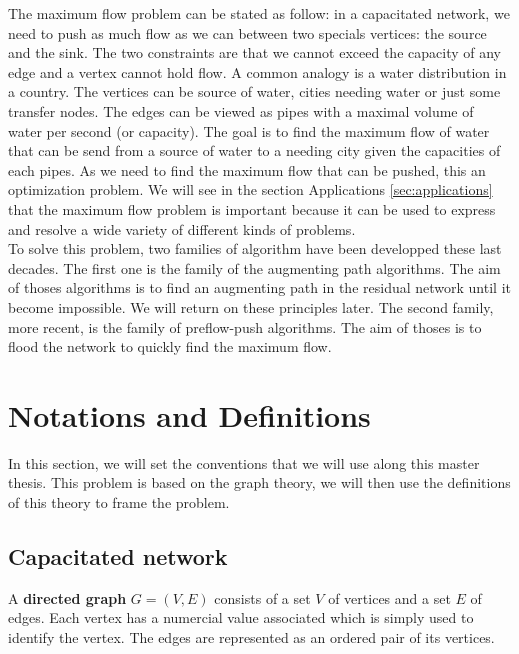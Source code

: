 The maximum flow problem can be stated as follow: in a capacitated network, we need to push as much flow as we can between two specials vertices: the source and the sink. The two constraints are that we cannot exceed the capacity of any edge and a vertex cannot hold flow. A common analogy is a water distribution in a country. The vertices can be source of water, cities needing water or just some transfer nodes. The edges can be viewed as pipes with a maximal volume of water per second (or capacity). The goal is to find the maximum flow of water that can be send from a source of water to a needing city given the capacities of each pipes. As we need to find the maximum flow that can be pushed, this an optimization problem. We will see in the section Applications \ref{sec:applications} that the maximum flow problem is important because it can be used to express and resolve a wide variety of different kinds of problems.\\

To solve this problem, two families of algorithm have been developped these last decades. The first one is the family of the augmenting path algorithms. The aim of thoses algorithms is to find an augmenting path in the residual network until it become impossible. We will return on these principles later. The second family, more recent, is the family of preflow-push algorithms. The aim of thoses is to flood the network to quickly find the maximum flow. \\


\section{Notations and Definitions}

In this section, we will set the conventions that we will use along this master thesis. This problem is based on the graph theory, we will then use the definitions of this theory to frame the problem.

\subsection{Capacitated network}
\begin{definition}
\label{dgraph}
A \textbf{directed graph} $G = (V, E)$ consists of a set $V$ of vertices and a set $E$ of edges. Each vertex has a numercial value associated which is simply used to identify the vertex. The edges are represented as an ordered pair of its vertices.
\end{definition}

